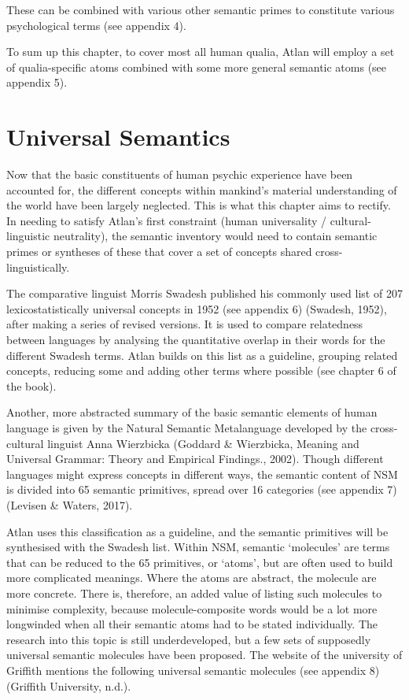 \noindent These can be combined with various other semantic primes to constitute various psychological terms (see appendix 4).  

To sum up this chapter, to cover most all human qualia, Atlan will employ a set of qualia-specific atoms combined with some more general semantic atoms (see appendix 5).

\section{Universal Semantics}

Now that the basic constituents of human psychic experience have been accounted for, the different concepts within mankind’s material understanding of the world have been largely neglected. This is what this chapter aims to rectify. In needing to satisfy Atlan’s first constraint (human universality / cultural-linguistic neutrality), the semantic inventory would need to contain semantic primes or syntheses of these that cover a set of concepts shared cross-linguistically.  

The comparative linguist Morris Swadesh published his commonly used list of 207 lexicostatistically universal concepts in 1952 (see appendix 6) (Swadesh, 1952), after making a series of revised versions. It is used to compare relatedness between languages by analysing the quantitative overlap in their words for the different Swadesh terms. Atlan builds on this list as a guideline, grouping related concepts, reducing some and adding other terms where possible (see chapter 6 of the book). 

Another, more abstracted summary of the basic semantic elements of human language is given by the Natural Semantic Metalanguage developed by the cross-cultural linguist Anna Wierzbicka (Goddard \& Wierzbicka, Meaning and Universal Grammar: Theory and Empirical Findings., 2002). Though different languages might express concepts in different ways, the semantic content of NSM is divided into 65 semantic primitives, spread over 16 categories (see appendix 7) (Levisen \& Waters, 2017). 

Atlan uses this classification as a guideline, and the semantic primitives will be synthesised with the Swadesh list. Within NSM, semantic ‘molecules’ are terms that can be reduced to the 65 primitives, or ‘atoms’, but are often used to build more complicated meanings. Where the atoms are abstract, the molecule are more concrete. There is, therefore, an added value of listing such molecules to minimise complexity, because molecule-composite words would be a lot more longwinded when all their semantic atoms had to be stated individually. The research into this topic is still underdeveloped, but a few sets of supposedly universal semantic molecules have been proposed. The website of the university of Griffith mentions the following universal semantic molecules (see appendix 8) (Griffith University, n.d.).  

